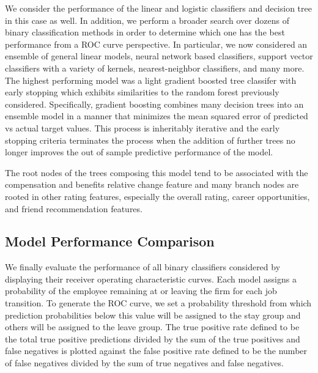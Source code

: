 \documentclass[10pt]{article}
\begin{document}
We consider the performance of the linear and logistic classifiers and decision tree in this 
case as well. In addition, we perform a broader search over dozens of binary classification 
methods in order to determine which one has the best performance from a ROC curve perspective. 
In particular, we now considered an ensemble of general linear models, neural network based 
classifiers, support vector classifiers with a variety of kernels, nearest-neighbor classifiers, and many more.
The highest performing model was a light gradient boosted tree classifer with 
early stopping which exhibits similarities to the random forest 
previously considered.  Specifically, gradient boosting combines many decision 
trees into an ensemble model in a manner that minimizes the mean squared 
error of predicted vs actual target values.  This process is inheritably iterative 
and the early stopping criteria terminates the process when the addition of 
further trees no longer improves the out of sample predictive performance of the model.

The root nodes of the trees composing this model tend to be associated with the 
compensation and benefits relative change feature and many branch nodes 
are rooted in other rating features, especially the overall rating, 
career opportunities, and friend recommendation features.

\subsection{Model Performance Comparison}

We finally evaluate the performance of all binary classifiers considered by displaying their 
receiver operating characteristic curves.  Each model assigns a probability of the employee 
remaining at or leaving the firm for each job transition.  To generate the ROC curve, 
we set a probability threshold from which prediction probabilities below this value 
will be assigned to the stay group and others will be assigned to the leave group.  
The true positive rate defined to be the total true positive predictions divided 
by the sum of the true positives and false negatives is plotted against the 
false positive rate defined to be the number of false negatives divided by the 
sum of true negatives and false negatives.
\end{document}

